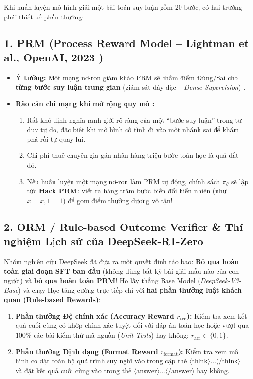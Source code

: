 Khi huấn luyện mô hình giải một bài toán suy luận gồm 20 bước, có hai trường phái thiết kế phần thưởng:

\subsection{1. PRM (Process Reward Model -- Lightman et al., OpenAI, 2023 \citealt{lightman2023lets})}
\begin{itemize}[leftmargin=1.2cm]
    \item \textbf{Ý tưởng:} Một mạng nơ-ron giám khảo PRM sẽ chấm điểm Đúng/Sai cho \textbf{từng bước suy luận trung gian} (giám sát dày đặc -- \textit{Dense Supervision}) \citep{uesato2022solving, lightman2023lets}.
    \item \textbf{Rào cản chí mạng khi mở rộng quy mô \citep{deepseek2025r1}:}
    \begin{enumerate}
        \item Rất khó định nghĩa ranh giới rõ ràng của một ``bước suy luận'' trong tư duy tự do, đặc biệt khi mô hình cố tình đi vào một nhánh sai để khám phá rồi tự quay lui.
        \item Chi phí thuê chuyên gia gán nhãn hàng triệu bước toán học là quá đắt đỏ.
        \item Nếu huấn luyện một mạng nơ-ron làm PRM tự động, chính sách $\pi_\theta$ sẽ lập tức \textbf{Hack PRM}: viết ra hàng trăm bước biến đổi hiển nhiên (như $x=x, 1=1$) để gom điểm thưởng dương vô tận!
    \end{enumerate}
\end{itemize}

\subsection{2. ORM / Rule-based Outcome Verifier \& Thí nghiệm Lịch sử của DeepSeek-R1-Zero \citep{deepseek2025r1}}
Nhóm nghiên cứu DeepSeek đã đưa ra một quyết định táo bạo: \textbf{Bỏ qua hoàn toàn giai đoạn SFT ban đầu} (không dùng bất kỳ bài giải mẫu nào của con người) và \textbf{bỏ qua hoàn toàn PRM}! Họ lấy thẳng Base Model (\textit{DeepSeek-V3-Base}) và chạy Học tăng cường trực tiếp chỉ với \textbf{hai phần thưởng luật khách quan (Rule-based Rewards)}:
\begin{enumerate}[leftmargin=1.2cm]
    \item \textbf{Phần thưởng Độ chính xác (Accuracy Reward $r_{\text{acc}}$):} Kiểm tra xem kết quả cuối cùng có khớp chính xác tuyệt đối với đáp án toán học hoặc vượt qua $100\%$ các bài kiểm thử mã nguồn (\textit{Unit Tests}) hay không: $r_{\text{acc}} \in \{0, 1\}$.
    \item \textbf{Phần thưởng Định dạng (Format Reward $r_{\text{format}}$):} Kiểm tra xem mô hình có đặt toàn bộ quá trình suy nghĩ vào trong cặp thẻ $\langle\text{think}\rangle \dots \langle/\text{think}\rangle$ và đặt kết quả cuối cùng vào trong thẻ $\langle\text{answer}\rangle \dots \langle/\text{answer}\rangle$ hay không.
\end{enumerate}

